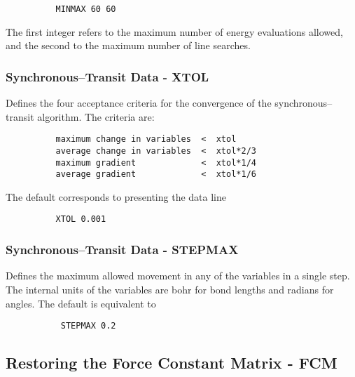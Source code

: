 \documentclass[11pt,fleqn]{article}
\begin{document}
{
\footnotesize
\begin{verbatim}
          MINMAX 60 60
\end{verbatim}
}
The first integer refers to the maximum number of energy evaluations allowed,
and the second to the maximum number of line searches.


\subsubsection[Synchronous--Transit Data - XTOL]{Synchronous--Transit Data - XTOL}

Defines the four acceptance criteria for the convergence of the
synchronous--transit algorithm. The criteria are:

{
\footnotesize
\begin{verbatim}
          maximum change in variables  <  xtol
          average change in variables  <  xtol*2/3
          maximum gradient             <  xtol*1/4
          average gradient             <  xtol*1/6
\end{verbatim}
}
The default corresponds to presenting the data line
{
\footnotesize
\begin{verbatim}
          XTOL 0.001
\end{verbatim}
}

\subsubsection[Synchronous--Transit Data - ]{Synchronous--Transit Data - STEPMAX}

Defines the maximum allowed movement in any of the variables
in a single step. The internal units of the variables are
bohr for bond lengths and radians for angles. The default is
equivalent to

{
\footnotesize
\begin{verbatim}
           STEPMAX 0.2
\end{verbatim}
}

\subsection[Restoring the Force Constant Matrix - FCM]{Restoring the Force Constant Matrix - FCM}
\end{document}
